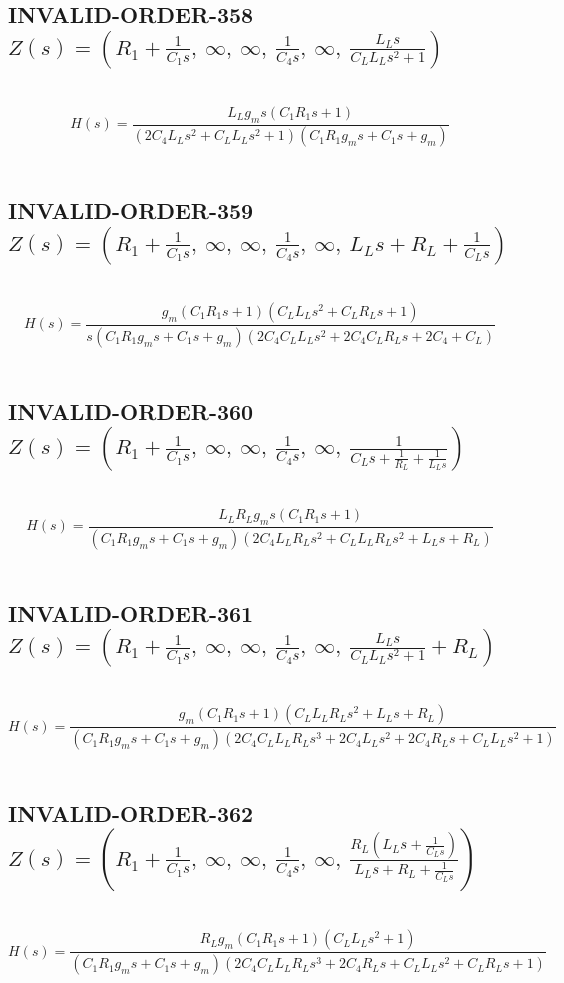 \documentclass{article}
\begin{document}
\subsection{INVALID-ORDER-358 $Z(s) = \left( R_{1} + \frac{1}{C_{1} s}, \  \infty, \  \infty, \  \frac{1}{C_{4} s}, \  \infty, \  \frac{L_{L} s}{C_{L} L_{L} s^{2} + 1}\right)$ } \ 
\textbf{\[H(s) = \frac{L_{L} g_{m} s \left(C_{1} R_{1} s + 1\right)}{\left(2 C_{4} L_{L} s^{2} + C_{L} L_{L} s^{2} + 1\right) \left(C_{1} R_{1} g_{m} s + C_{1} s + g_{m}\right)}\] } \ 
\subsection{INVALID-ORDER-359 $Z(s) = \left( R_{1} + \frac{1}{C_{1} s}, \  \infty, \  \infty, \  \frac{1}{C_{4} s}, \  \infty, \  L_{L} s + R_{L} + \frac{1}{C_{L} s}\right)$ } \ 
\textbf{\[H(s) = \frac{g_{m} \left(C_{1} R_{1} s + 1\right) \left(C_{L} L_{L} s^{2} + C_{L} R_{L} s + 1\right)}{s \left(C_{1} R_{1} g_{m} s + C_{1} s + g_{m}\right) \left(2 C_{4} C_{L} L_{L} s^{2} + 2 C_{4} C_{L} R_{L} s + 2 C_{4} + C_{L}\right)}\] } \ 
\subsection{INVALID-ORDER-360 $Z(s) = \left( R_{1} + \frac{1}{C_{1} s}, \  \infty, \  \infty, \  \frac{1}{C_{4} s}, \  \infty, \  \frac{1}{C_{L} s + \frac{1}{R_{L}} + \frac{1}{L_{L} s}}\right)$ } \ 
\textbf{\[H(s) = \frac{L_{L} R_{L} g_{m} s \left(C_{1} R_{1} s + 1\right)}{\left(C_{1} R_{1} g_{m} s + C_{1} s + g_{m}\right) \left(2 C_{4} L_{L} R_{L} s^{2} + C_{L} L_{L} R_{L} s^{2} + L_{L} s + R_{L}\right)}\] } \ 
\subsection{INVALID-ORDER-361 $Z(s) = \left( R_{1} + \frac{1}{C_{1} s}, \  \infty, \  \infty, \  \frac{1}{C_{4} s}, \  \infty, \  \frac{L_{L} s}{C_{L} L_{L} s^{2} + 1} + R_{L}\right)$ } \ 
\textbf{\[H(s) = \frac{g_{m} \left(C_{1} R_{1} s + 1\right) \left(C_{L} L_{L} R_{L} s^{2} + L_{L} s + R_{L}\right)}{\left(C_{1} R_{1} g_{m} s + C_{1} s + g_{m}\right) \left(2 C_{4} C_{L} L_{L} R_{L} s^{3} + 2 C_{4} L_{L} s^{2} + 2 C_{4} R_{L} s + C_{L} L_{L} s^{2} + 1\right)}\] } \ 
\subsection{INVALID-ORDER-362 $Z(s) = \left( R_{1} + \frac{1}{C_{1} s}, \  \infty, \  \infty, \  \frac{1}{C_{4} s}, \  \infty, \  \frac{R_{L} \left(L_{L} s + \frac{1}{C_{L} s}\right)}{L_{L} s + R_{L} + \frac{1}{C_{L} s}}\right)$ } \ 
\textbf{\[H(s) = \frac{R_{L} g_{m} \left(C_{1} R_{1} s + 1\right) \left(C_{L} L_{L} s^{2} + 1\right)}{\left(C_{1} R_{1} g_{m} s + C_{1} s + g_{m}\right) \left(2 C_{4} C_{L} L_{L} R_{L} s^{3} + 2 C_{4} R_{L} s + C_{L} L_{L} s^{2} + C_{L} R_{L} s + 1\right)}\] } \ 
\end{document}
